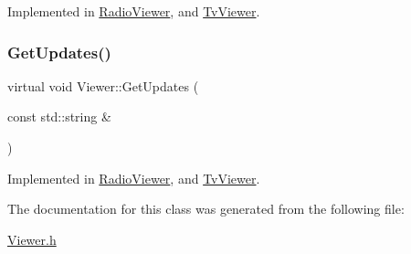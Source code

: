 Implemented in \mbox{\hyperlink{class_radio_viewer_a24b69945b935d384749282fbad9ad606}{Radio\+Viewer}}, and \mbox{\hyperlink{class_tv_viewer_ae0f96f6541d17b9a4caa81c6bfb054b2}{Tv\+Viewer}}.

\mbox{\label{class_viewer_afc23a6059e52f018df843de22b641d83}} 
\subsubsection{\texorpdfstring{GetUpdates()}{GetUpdates()}}
{\footnotesize\ttfamily virtual void Viewer\+::\+Get\+Updates (\begin{DoxyParamCaption}\item[{const std\+::string \&}]{ }\end{DoxyParamCaption})\hspace{0.3cm}{\ttfamily [pure virtual]}}



Implemented in \mbox{\hyperlink{class_radio_viewer_a6600dc7ffbf75ad3ffebbe7b9e89f51e}{Radio\+Viewer}}, and \mbox{\hyperlink{class_tv_viewer_a7454005f7759194c72474f885a649e9b}{Tv\+Viewer}}.



The documentation for this class was generated from the following file\+:\begin{DoxyCompactItemize}
\item 
\mbox{\hyperlink{_viewer_8h}{Viewer.\+h}}\end{DoxyCompactItemize}
